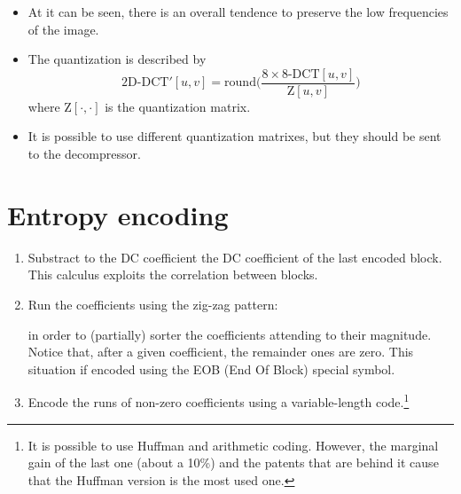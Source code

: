 \begin{itemize}
\item At it can be seen, there is an overall tendence to preserve the
  low frequencies of the image.

\item The quantization is described by
  \begin{equation}
    \text{2D-DCT}'[u,v] = \text{round}\Big(\frac{8\times 8\text{-DCT}[u,v]}{\text{Z}[u,v]}\Big)
  \end{equation}
  where $\text{Z}[\cdot,\cdot]$ is the quantization matrix.
\item It is possible to use different quantization matrixes, but they
  should be sent to the decompressor.
\end{itemize}

\section{Entropy encoding}
\begin{enumerate}
\item Substract to the DC coefficient the DC coefficient of the last
  encoded block. This calculus exploits the correlation between
  blocks.
\item Run the coefficients using the zig-zag pattern:
  \begin{center}
  \end{center}
  in order to (partially) sorter the coefficients attending to their
  magnitude. Notice that, after a given coefficient, the remainder
  ones are zero. This situation if encoded using the EOB (End Of
  Block) special symbol.
\item Encode the runs of non-zero coefficients using a variable-length
  code.\footnote{It is possible to use Huffman and arithmetic
    coding. However, the marginal gain of the last one (about a 10\%)
    and the patents that are behind it cause that the Huffman version
    is the most used one.}
\end{enumerate}

